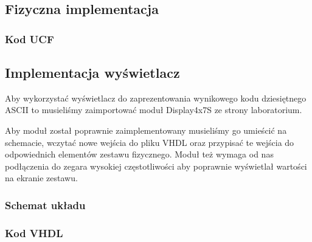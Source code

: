 \documentclass[a4paper,12pt]{extarticle}  %
\begin{document}
\subsection{Fizyczna implementacja}
\subsubsection{Kod UCF}

\subsection{Implementacja wyświetlacz}
Aby wykorzystać wyświetlacz do zaprezentowania wynikowego kodu dziesiętnego ASCII to musieliśmy zaimportować moduł Display4x7S ze strony laboratorium.

Aby moduł został poprawnie zaimplementowany musieliśmy go umieścić na schemacie, wczytać nowe wejścia do pliku VHDL oraz przypisać te wejścia do odpowiednich elementów zestawu fizycznego.
Moduł też wymaga od nas podłączenia do zegara wysokiej częstotliwości aby poprawnie wyświetlał wartości na ekranie zestawu.
\subsubsection{Schemat układu}
\begin{figure}[H]
	\centering
\end{figure}
\subsubsection{Kod VHDL}

\end{document}
